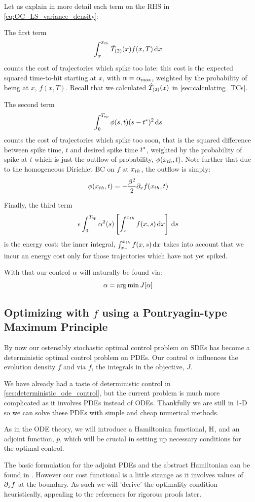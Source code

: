 \documentclass{article}
\begin{document}
Let us explain in more detail each term on the RHS in
\cref{eq:OC_LS_variance_density}:

The first term
$$
\int_{ x_{-} }^{ x_{th} } { \hat{T}_{(2)} }(x) f(x,T) \, \mathrm{d} x
$$
counts the cost of trajectories which spike too late:
this cost is the expected squared time-to-hit starting at $x$, with  ${\alpha}
= { {\alpha}_{\textrm{max}} }$, weighted by the probability of being at $x$, $f(x,T)$. Recall that we
calculated ${ \hat{T}_{(2)} }(x)$ in \cref{sec:calculating_TCs}.

The second term
$$
\int_0^{ T_{\textrm{sp} } } \phi(s,t) (s-{ t^* })^2 \, \mathrm{d} s
$$
counts the cost of trajectories which spike too soon, that
is the squared difference between spike time, $t$ and desired spike time ${ t^* }$,
weighted by the probability of spike at $t$ which is just the outflow of
probability, $\phi({ x_{th} },t)$. Note further that due to the homogeneous
Dirichlet BC on $f$ at ${ x_{th} }$, the outflow is simply:
$$
\phi({ x_{th} }, t) = -\frac{{\beta}^2 }{2} {\partial}_x f({ x_{th} }, t) 
$$

Finally, the third term
$$
{\epsilon} \int_0^{ T_{\textrm{sp} } }  {\alpha}^2(s)  \left[  \int_{ x_{-} }^{ x_{th} } f(x,s) \, \mathrm{d} x \right] \, \mathrm{d} s
$$
is the energy cost: the inner integral, $\int_{ x_{-} }^{ x_{th} } f(x,s) \, \mathrm{d} x$
takes into account that we incur an energy cost only for those trajectories
which have not yet spiked.

With that our control ${\alpha}$ will naturally be found via:
$$
\a = \argmin J[\a]
$$

\subsection{Optimizing with $f$ using a Pontryagin-type Maximum Principle}
\label{sec:PDE_max_principle_for_pdf}
By now our ostensibly stochastic optimal control problem on SDEs
has become a deterministic optimal control problem on PDEs. Our control ${\alpha}$
influences the evolution density $f$ and via $f$, the integrals in the
objective, $J$.

We have already had a taste of deterministic control in
\cref{sec:deterministic_ode_control}, but the current problem is much more
complicated as it involves PDEs instead of ODEs. Thankfully we are still in 1-D
so we can solve these PDEs with simple and cheap numerical methods. 

As in the ODE theory, we will introduce a Hamiltonian functional, ${ \mathbb{H}}$, and an
adjoint function, $p$, which will be crucial in setting up necessary
conditions for the optimal control.

The basic formulation for the adjoint PDEs and the abstract Hamiltonian can be
found in \cite{Fattorini1999,Palmer2011}. However our cost functional is a
little strange as it involves values of ${\partial}_x f$ at the boundary. As such we
will 'derive' the optimality condition heuristically, appealing to the
references for rigorous proofs later.
 
\end{document}
